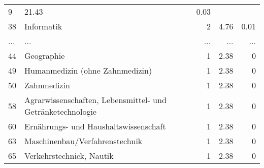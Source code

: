 \begin{longtable}{lXrrr}
          \num{9} &
          \num[round-mode=places,round-precision=2]{21.43} &
          \num[round-mode=places,round-precision=2]{0.03} \\
        38 & \multicolumn{1}{X}{Informatik} & %
          \num{2} &
          \num[round-mode=places,round-precision=2]{4.76} &
          \num[round-mode=places,round-precision=2]{0.01} \\
       ... & ... & ... & ... & ... \\
        44 & \multicolumn{1}{X}{Geographie} & %
          \num{1} &
          \num[round-mode=places,round-precision=2]{2.38} &
          \num[round-mode=places,round-precision=2]{0} \\

        49 & \multicolumn{1}{X}{Humanmedizin (ohne Zahnmedizin)} & %
          \num{1} &
          \num[round-mode=places,round-precision=2]{2.38} &
          \num[round-mode=places,round-precision=2]{0} \\

        50 & \multicolumn{1}{X}{Zahnmedizin} & %
          \num{1} &
          \num[round-mode=places,round-precision=2]{2.38} &
          \num[round-mode=places,round-precision=2]{0} \\

        58 & \multicolumn{1}{X}{Agrarwissenschaften, Lebensmittel- und Getränketechnologie} & %
          \num{1} &
          \num[round-mode=places,round-precision=2]{2.38} &
          \num[round-mode=places,round-precision=2]{0} \\

        60 & \multicolumn{1}{X}{Ernährungs- und Haushaltswissenschaft} & %
          \num{1} &
          \num[round-mode=places,round-precision=2]{2.38} &
          \num[round-mode=places,round-precision=2]{0} \\

        63 & \multicolumn{1}{X}{Maschinenbau/Verfahrenstechnik} & %
          \num{1} &
          \num[round-mode=places,round-precision=2]{2.38} &
          \num[round-mode=places,round-precision=2]{0} \\

        65 & \multicolumn{1}{X}{Verkehrstechnick, Nautik} & %
          \num{1} &
          \num[round-mode=places,round-precision=2]{2.38} &
          \num[round-mode=places,round-precision=2]{0} \\


\end{longtable}
